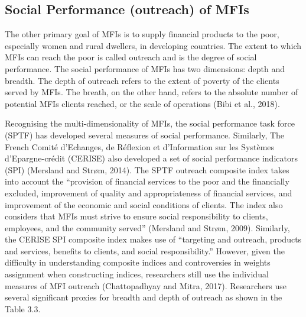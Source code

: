 \documentclass[a4paper, nobind]{templates/ociamthesis}
\begin{document}
\hypertarget{social-performance-outreach-of-mfis}{%
\subsection{Social Performance (outreach) of MFIs}\label{social-performance-outreach-of-mfis}}

The other primary goal of MFIs is to supply financial products to the poor, especially women and rural dwellers, in developing countries. The extent to which MFIs can reach the poor is called outreach and is the degree of social performance. The social performance of MFIs has two dimensions: depth and breadth. The depth of outreach refers to the extent of poverty of the clients served by MFIs. The breath, on the other hand, refers to the absolute number of potential MFIs clients reached, or the scale of operations (Bibi et al., 2018).

Recognising the multi-dimensionality of MFIs, the social performance task force (SPTF) has developed several measures of social performance. Similarly, The French Comité d'Echanges, de Réflexion et d'Information sur les Systèmes d'Epargne-crédit (CERISE) also developed a set of social performance indicators (SPI) (Mersland and Strøm, 2014). The SPTF outreach composite index takes into account the ``provision of financial services to the poor and the financially excluded, improvement of quality and appropriateness of financial services, and improvement of the economic and social conditions of clients. The index also considers that MFIs must strive to ensure social responsibility to clients, employees, and the community served'' (Mersland and Strøm, 2009). Similarly, the CERISE SPI composite index makes use of ``targeting and outreach, products and services, benefits to clients, and social responsibility.'' However, given the difficulty in understanding composite indices and controversies in weights assignment when constructing indices, researchers still use the individual measures of MFI outreach (Chattopadhyay and Mitra, 2017). Researchers use several significant proxies for breadth and depth of outreach as shown in the Table 3.3.
\end{document}
